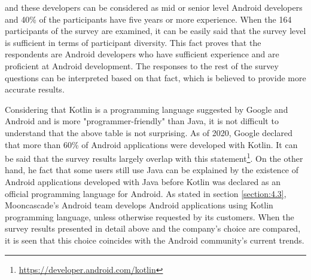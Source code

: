 and these developers can be considered as mid or senior level Android developers and 40\% of the participants have five years or more experience.
When the 164 participants of the survey are examined, it can be easily said that the survey level is sufficient in terms of participant diversity. This fact proves that the respondents are Android developers who have sufficient experience and are proficient at Android development. The responses to the rest of the survey questions can be interpreted based on that fact, which is believed to provide more accurate results.

Considering that Kotlin is a programming language suggested by Google and Android and is more "programmer-friendly" than Java, it is not difficult to understand that the above table is not surprising. As of 2020, Google declared that more than 60\% of Android applications were developed with Kotlin. It can be said that the survey results largely overlap with this statement\footnote{\url{https://developer.android.com/kotlin}}. On the other hand, he fact that some users still use Java can be explained by the existence of Android applications developed with Java before Kotlin was declared as an official programming language for Android. As stated in section \ref{section:4.3}, Mooncascade's Android team develops Android applications using Kotlin programming language, unless otherwise requested by its customers. When the survey results presented in detail above and the company's choice are compared, it is seen that this choice coincides with the Android community’s current trends.

